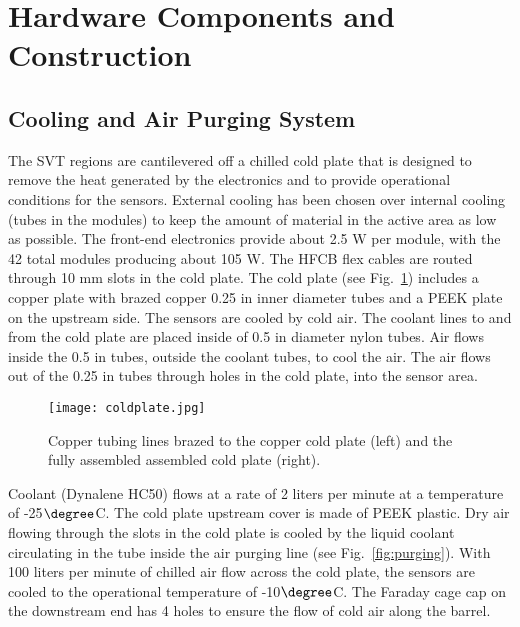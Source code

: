 \section{Hardware Components and Construction}

\subsection{Cooling and Air Purging System}

The SVT regions are cantilevered off a chilled cold plate that is designed to remove the heat generated by the electronics and to provide operational  conditions for the sensors. External cooling has been chosen over internal cooling (tubes in the modules) to keep the amount of material in the active area as low as possible. The front-end electronics provide about 2.5 W per module, with the 42 total modules producing about 105 W. The HFCB flex cables are routed through 10 mm slots in the cold plate. The cold plate (see Fig.~\ref{fig:coldplate}) includes a copper plate with brazed  copper 0.25 in inner diameter tubes and a PEEK plate on the upstream side. The sensors are cooled by cold air.  The coolant lines to and from the cold plate are placed inside of 0.5 in diameter nylon tubes.  Air flows inside the 0.5 in tubes, outside the coolant tubes, to cool the air.  The air flows out of the 0.25 in tubes through holes in the cold plate, into the sensor area.

\begin{figure}[hbt] 
\centering 
\texttt{[image: coldplate.jpg]}
\caption{Copper tubing lines brazed to the copper cold plate (left) and the fully assembled assembled cold plate (right).}
\label{fig:coldplate}
\end{figure}


Coolant (Dynalene HC50) flows at a rate of 2 liters per minute at a temperature of -25$\degree$C. The cold plate upstream cover is made of PEEK plastic. Dry air flowing through the slots in the cold plate is cooled by the liquid coolant circulating in the tube inside the air purging line (see Fig.~\ref{fig:purging}). With 100 liters per minute of chilled air flow across the cold plate, the sensors are cooled to the operational temperature of -10$\degree$C. The Faraday cage cap on the downstream end has 4 holes to ensure the flow of cold air along the barrel. 

